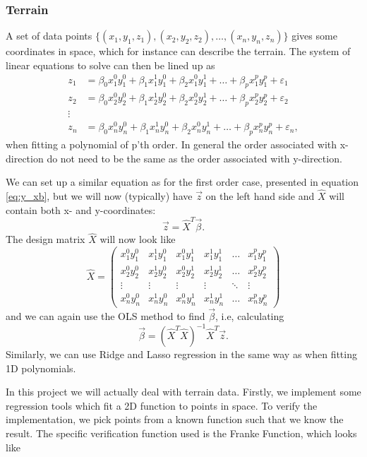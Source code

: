 \subsubsection{Terrain} \label{sec:terrain}
A set of data points $\{(x_1, y_1, z_1), (x_2, y_2, z_2),\hdots, (x_n, y_n,z_n)\}$ gives some coordinates in space, which for instance can describe the terrain. The system of linear equations to solve can then be lined up as 
\begin{align*}
z_1&=\beta_0x_1^0y_1^0+\beta_1x_1^1y_1^0+\beta_2x_1^0y_1^1+\hdots+\beta_px_1^py_1^p+\varepsilon_1\\
z_2&=\beta_0x_2^0y_2^0+\beta_1x_2^1y_2^0+\beta_2x_2^0y_2^1+\hdots+\beta_px_2^py_2^p+\varepsilon_2\\
\vdots\\
z_n&=\beta_0x_n^0y_n^0+\beta_1x_n^1y_n^0+\beta_2x_n^0y_n^1+\hdots+\beta_px_n^py_n^p+\varepsilon_n,
\end{align*}
when fitting a polynomial of p'th order. In general the order associated with x-direction do not need to be the same as the order associated with y-direction. 

We can set up a similar equation as for the first order case, presented in equation \eqref{eq:y_xb}, but we will now (typically) have $\vec{z}$ on the left hand side and $\hat{X}$ will contain both x- and y-coordinates:
\begin{equation}
\vec{z}=\hat{X}^T\vec{\beta}.
\end{equation}
The design matrix $\hat{X}$ will now look like
\begin{equation}
\hat{X}=
\begin{pmatrix}
x_1^0y_1^0&x_1^1y_1^0&x_1^0y_1^1&x_1^1y_1^1&\hdots&x_1^py_1^p\\
x_2^0y_2^0&x_2^1y_2^0&x_2^0y_2^1&x_2^1y_2^1&\hdots&x_2^py_2^p\\
\vdots&\vdots&\vdots&\vdots&\ddots&\vdots\\
x_n^0y_n^0&x_n^1y_n^0&x_n^0y_n^1&x_n^1y_n^1&\hdots&x_n^py_n^p
\end{pmatrix}
\end{equation}
and we can again use the OLS method to find $\vec{\beta}$, i.e, calculating
\begin{equation}
\vec{\beta}=(\hat{X}^T\hat{X})^{-1}\hat{X}^T\vec{z}.
\end{equation}
Similarly, we can use Ridge and Lasso regression in the same way as when fitting 1D polynomials. 

In this project we will actually deal with terrain data. Firstly, we implement some regression tools which fit a 2D function to points in space. To verify the implementation, we pick points from a known function such that we know the result. The specific verification function used is the Franke Function, which looks like

